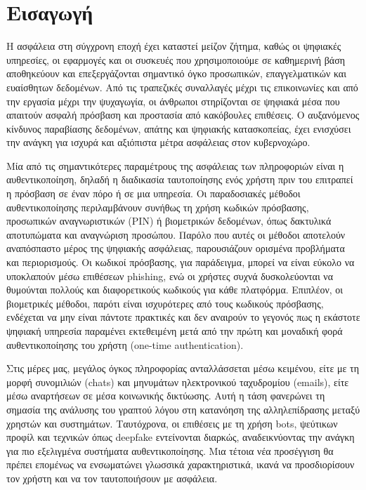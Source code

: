 \chapter{Εισαγωγή}
\label{chapter:intro}

Η ασφάλεια στη σύγχρονη εποχή έχει καταστεί μείζον ζήτημα, καθώς οι ψηφιακές υπηρεσίες, οι εφαρμογές και οι συσκευές που χρησιμοποιούμε σε καθημερινή βάση αποθηκεύουν και επεξεργάζονται σημαντικό όγκο προσωπικών, επαγγελματικών και ευαίσθητων δεδομένων. Από τις τραπεζικές συναλλαγές μέχρι τις επικοινωνίες και από την εργασία μέχρι την ψυχαγωγία, οι άνθρωποι στηρίζονται σε ψηφιακά μέσα που απαιτούν ασφαλή πρόσβαση και προστασία από κακόβουλες επιθέσεις. Ο αυξανόμενος κίνδυνος παραβίασης δεδομένων, απάτης και ψηφιακής κατασκοπείας, έχει ενισχύσει την ανάγκη για ισχυρά και αξιόπιστα μέτρα ασφάλειας στον κυβερνοχώρο.

Μία από τις σημαντικότερες παραμέτρους της ασφάλειας των πληροφοριών είναι η αυθεντικοποίηση, δηλαδή η διαδικασία ταυτοποίησης ενός χρήστη πριν του επιτραπεί η πρόσβαση σε έναν πόρο ή σε μια υπηρεσία. Οι παραδοσιακές μέθοδοι αυθεντικοποίησης περιλαμβάνουν συνήθως τη χρήση κωδικών πρόσβασης, προσωπικών αναγνωριστικών (PIN) ή βιομετρικών δεδομένων, όπως δακτυλικά αποτυπώματα και αναγνώριση προσώπου. Παρόλο που αυτές οι μέθοδοι αποτελούν αναπόσπαστο μέρος της ψηφιακής ασφάλειας, παρουσιάζουν ορισμένα προβλήματα και περιορισμούς. Οι κωδικοί πρόσβασης, για παράδειγμα, μπορεί να είναι εύκολο να υποκλαπούν μέσω επιθέσεων phishing, ενώ οι χρήστες συχνά δυσκολεύονται να θυμούνται πολλούς και διαφορετικούς κωδικούς για κάθε πλατφόρμα. Επιπλέον, οι βιομετρικές μέθοδοι, παρότι είναι ισχυρότερες από τους κωδικούς πρόσβασης, ενδέχεται να μην είναι πάντοτε πρακτικές και δεν αναιρούν το γεγονός πως η εκάστοτε ψηφιακή υπηρεσία παραμένει εκτεθειμένη μετά από την πρώτη και μοναδική φορά αυθεντικοποίησης του χρήστη (one-time authentication).

Στις μέρες μας, μεγάλος όγκος πληροφορίας ανταλλάσσεται μέσω κειμένου, είτε με τη μορφή συνομιλιών (chats) και μηνυμάτων  ηλεκτρονικού ταχυδρομίου (emails), είτε μέσω αναρτήσεων σε μέσα κοινωνικής δικτύωσης. Αυτή η τάση φανερώνει τη σημασία της ανάλυσης του γραπτού λόγου στη κατανόηση της αλληλεπίδρασης μεταξύ χρηστών και συστημάτων. Ταυτόχρονα, οι επιθέσεις με τη χρήση bots, ψεύτικων προφίλ και τεχνικών όπως deepfake εντείνονται διαρκώς, αναδεικνύοντας την ανάγκη για πιο εξελιγμένα συστήματα αυθεντικοποίησης. Μια τέτοια νέα προσέγγιση θα πρέπει επομένως να ενσωματώνει γλωσσικά χαρακτηριστικά, ικανά να προσδιορίσουν τον χρήστη και να τον ταυτοποιήσουν με ασφάλεια.


